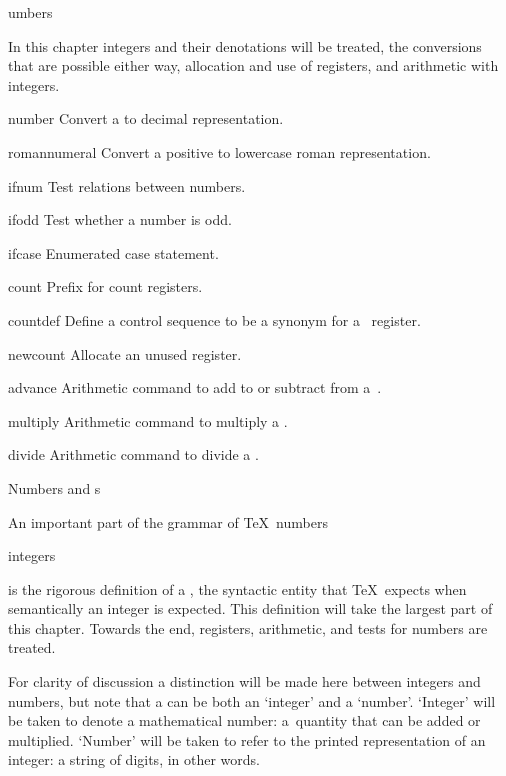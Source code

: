 \subject[number]  Numbers

In this chapter integers and their
denotations will be treated,
the conversions that are possible either way, 
allocation and use of  registers, and
arithmetic with integers.

\invent 
\item number 
      Convert a  to decimal representation. 

\item romannumeral 
      Convert a positive  to lowercase roman representation.

\item ifnum 
      Test relations between numbers.

\item ifodd 
      Test whether a number is odd.

\item ifcase 
      Enumerated case statement.


\item count 
      Prefix for count registers. 

\item countdef 
      Define a control sequence to be a synonym for
      a~ register.

\item newcount 
      Allocate an unused  register. 

\item advance 
      Arithmetic command to add to or subtract from 
      a~.

\item multiply 
      Arithmetic command to multiply a .

\item divide 
      Arithmetic command to divide a .

\inventstop


\point Numbers and s

An important part of the grammar of \TeX\ 
\term numbers\par\term integers\par
is the rigorous definition of a , the syntactic
entity that \TeX\ expects when semantically an integer is
expected. This definition will take the largest part of this
chapter. Towards the end,  registers, arithmetic,
and tests for numbers are treated.

For clarity of discussion a distinction will be made
here between integers and numbers, 
but note that a  can be both
an `integer' and a `number'.
`Integer'  will be taken to denote a mathematical number:
a~quantity that can be added or multiplied.
`Number' will be taken to refer to the printed representation
of an integer: a string of digits, in other words.

